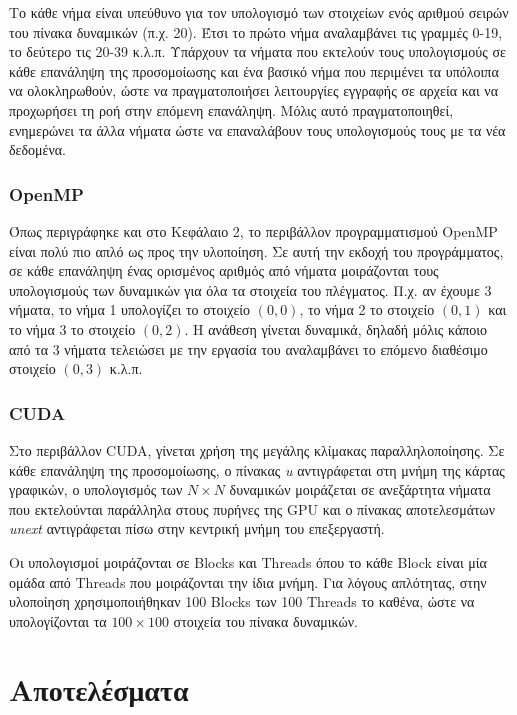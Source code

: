 \documentclass[12pt,a4paper]{article}
\begin{document}
Το κάθε νήμα είναι υπεύθυνο για τον υπολογισμό των στοιχείων ενός αριθμού σειρών του πίνακα δυναμικών (π.χ. 20). Έτσι το πρώτο νήμα αναλαμβάνει τις γραμμές 0-19, το δεύτερο τις 20-39 κ.λ.π. Υπάρχουν τα νήματα που εκτελούν τους υπολογισμούς σε κάθε επανάληψη της προσομοίωσης και ένα βασικό νήμα που περιμένει τα υπόλοιπα να ολοκληρωθούν, ώστε να πραγματοποιήσει λειτουργίες εγγραφής σε αρχεία και να προχωρήσει τη ροή στην επόμενη επανάληψη. Μόλις αυτό πραγματοποιηθεί, ενημερώνει τα άλλα νήματα ώστε να επαναλάβουν τους υπολογισμούς τους με τα νέα δεδομένα.

\subsubsection{OpenMP}

Όπως περιγράφηκε και στο Κεφάλαιο 2, το περιβάλλον προγραμματισμού OpenMP είναι πολύ πιο απλό ως προς την υλοποίηση. Σε αυτή την εκδοχή του προγράμματος, σε κάθε επανάληψη ένας ορισμένος αριθμός από νήματα μοιράζονται τους υπολογισμούς των δυναμικών για όλα τα στοιχεία του πλέγματος. Π.χ. αν έχουμε 3 νήματα, το νήμα 1 υπολογίζει το στοιχείο $(0,0)$, το νήμα 2 το στοιχείο $(0,1)$ και το νήμα 3 το στοιχείο $(0,2)$. Η ανάθεση γίνεται δυναμικά, δηλαδή μόλις κάποιο από τα 3 νήματα τελειώσει με την εργασία του αναλαμβάνει το επόμενο διαθέσιμο στοιχείο $(0,3)$ κ.λ.π.

\subsubsection{CUDA}

Στο περιβάλλον CUDA, γίνεται χρήση της μεγάλης κλίμακας παραλληλοποίησης. Σε κάθε επανάληψη της προσομοίωσης, ο πίνακας \textit{u} αντιγράφεται στη μνήμη της κάρτας γραφικών, ο υπολογισμός των $N \times N$ δυναμικών μοιράζεται σε ανεξάρτητα νήματα που εκτελούνται παράλληλα στους πυρήνες της GPU και ο πίνακας αποτελεσμάτων \textit{unext} αντιγράφεται πίσω στην κεντρική μνήμη του επεξεργαστή.

Οι υπολογισμοί μοιράζονται σε Blocks και Threads όπου το κάθε Block είναι μία ομάδα από Threads που μοιράζονται την ίδια μνήμη. Για λόγους απλότητας, στην υλοποίηση χρησιμοποιήθηκαν 100 Blocks των 100 Threads το καθένα, ώστε να υπολογίζονται τα $100 \times 100$ στοιχεία του πίνακα δυναμικών.


\newpage

\section{Αποτελέσματα}
\end{document}
